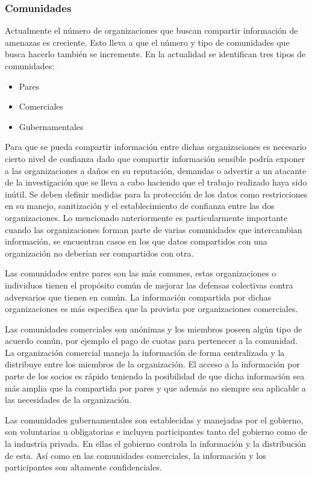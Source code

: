 \subsubsection{Comunidades}
Actualmente el número de organizaciones que buscan compartir información de
amenazas es creciente. Esto lleva a que el número y tipo de comunidades que busca
hacerlo también se incremente. En la actualidad se identifican tres tipos de comunidades:
\begin{itemize}
  \item Pares
  \item Comerciales
  \item Gubernamentales
\end{itemize}

Para que se pueda compartir información entre dichas organizaciones es necesario
cierto nivel de confianza dado que compartir información sensible podría exponer 
a las organizaciones a daños en su reputación, demandas o advertir a un 
atacante de la investigación que se lleva a cabo haciendo que el trabajo 
realizado haya sido inútil. Se deben definir medidas para la protección de los 
datos como restricciones en su manejo, sanitización y el establecimiento de 
confianza entre las dos organizaciones. Lo mencionado anteriormente es 
particularmente importante cuando las organizaciones forman parte de varias 
comunidades que intercambian información, se encuentran casos en los que datos 
compartidos con una organización no deberían ser compartidos con otra.

Las comunidades entre pares son las más comunes, estas organizaciones o 
individuos tienen el propósito común de mejorar las defensas colectivas contra 
adversarios que tienen en común. La información compartida por dichas 
organizaciones es más especifica que la provista por organizaciones comerciales.

Las comunidades comerciales son anónimas y los miembros poseen algún tipo de 
acuerdo común, por ejemplo el pago de cuotas para pertenecer a la comunidad. 
La organización comercial maneja la información de forma centralizada y la 
distribuye entre los miembros de la organización. El acceso a la información por 
parte de los socios es rápido teniendo la posibilidad de que dicha información 
sea más amplia que la compartida por pares y que además no siempre sea aplicable a las 
necesidades de la organización.

Las comunidades gubernamentales son establecidas y manejadas por el gobierno, 
son voluntarias u obligatorias e incluyen participantes tanto del gobierno como 
de la industria privada. En ellas el gobierno controla la información y la 
distribución de esta. Así como en las comunidades comerciales, la información y 
los participantes son altamente confidenciales.

